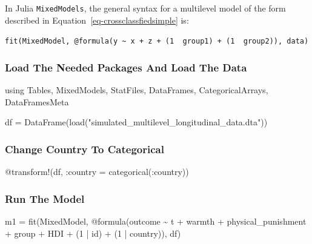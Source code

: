 \documentclass[
  letterpaper,
  DIV=11,
  numbers=noendperiod,
  oneside]{scrreprt}
\newenvironment{Shaded}{\begin{snugshade}}{\end{snugshade}}
\newcommand{\BuiltInTok}[1]{\textcolor[rgb]{0.00,0.23,0.31}{#1}}
\newcommand{\FloatTok}[1]{\textcolor[rgb]{0.68,0.00,0.00}{#1}}
\newcommand{\FunctionTok}[1]{\textcolor[rgb]{0.28,0.35,0.67}{#1}}
\newcommand{\ImportTok}[1]{\textcolor[rgb]{0.00,0.46,0.62}{#1}}
\newcommand{\NormalTok}[1]{\textcolor[rgb]{0.00,0.23,0.31}{#1}}
\newcommand{\OperatorTok}[1]{\textcolor[rgb]{0.37,0.37,0.37}{#1}}
\newcommand{\PreprocessorTok}[1]{\textcolor[rgb]{0.68,0.00,0.00}{#1}}
\newcommand{\StringTok}[1]{\textcolor[rgb]{0.13,0.47,0.30}{#1}}
\begin{document}
In Julia \texttt{MixedModels}, the general syntax for a multilevel model
of the form described in Equation~\ref{eq-crossclassfiedsimple} is:

\texttt{fit(MixedModel,\ @formula(y\ \textasciitilde{}\ x\ +\ z\ +\ (1\ \textbar{}\ group1)\ +\ (1\ \textbar{}\ group2)),\ data)}

\hypertarget{load-the-needed-packages-and-load-the-data-1}{%
\subsubsection{Load The Needed Packages And Load The
Data}\label{load-the-needed-packages-and-load-the-data-1}}

\begin{Shaded}
\begin{Highlighting}[]
\ImportTok{using} \BuiltInTok{Tables}\NormalTok{, }\BuiltInTok{MixedModels}\NormalTok{, }\BuiltInTok{StatFiles}\NormalTok{, }\BuiltInTok{DataFrames}\NormalTok{, }\BuiltInTok{CategoricalArrays}\NormalTok{, }\BuiltInTok{DataFramesMeta}

\NormalTok{df }\OperatorTok{=} \FunctionTok{DataFrame}\NormalTok{(}\FunctionTok{load}\NormalTok{(}\StringTok{"simulated\_multilevel\_longitudinal\_data.dta"}\NormalTok{))}
\end{Highlighting}
\end{Shaded}

\hypertarget{change-country-to-categorical-1}{%
\subsubsection{Change Country To
Categorical}\label{change-country-to-categorical-1}}

\begin{Shaded}
\begin{Highlighting}[]
\PreprocessorTok{@transform}\NormalTok{!(df, }\OperatorTok{:}\NormalTok{country }\OperatorTok{=} \FunctionTok{categorical}\NormalTok{(}\OperatorTok{:}\NormalTok{country))}
\end{Highlighting}
\end{Shaded}

\hypertarget{run-the-model-5}{%
\subsubsection{Run The Model}\label{run-the-model-5}}

\begin{Shaded}
\begin{Highlighting}[]

\NormalTok{m1 }\OperatorTok{=} \FunctionTok{fit}\NormalTok{(MixedModel, }\PreprocessorTok{@formula}\NormalTok{(outcome }\OperatorTok{\textasciitilde{}}\NormalTok{ t }\OperatorTok{+}\NormalTok{ warmth }\OperatorTok{+}\NormalTok{ physical\_punishment }\OperatorTok{+} 
\NormalTok{                                group }\OperatorTok{+}\NormalTok{ HDI }\OperatorTok{+}
\NormalTok{                                (}\FloatTok{1} \OperatorTok{|}\NormalTok{ id) }\OperatorTok{+}
\NormalTok{                                (}\FloatTok{1} \OperatorTok{|}\NormalTok{ country)), df)}
\end{Highlighting}
\end{Shaded}
\end{document}
